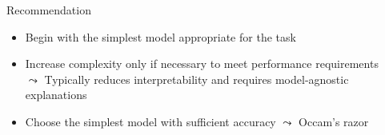 \documentclass[10pt,compress,t,notes=noshow, xcolor=table]{beamer}
\begin{document}
\begin{frame}{Recommendation}
\begin{itemize}
    \item Begin with the simplest model appropriate for the task
    \item Increase complexity only if necessary to meet performance requirements\\
    $\leadsto$ Typically reduces interpretability and requires model-agnostic explanations
    \item Choose the simplest model with sufficient accuracy 
    $\leadsto$ Occam’s razor
\end{itemize}
    \bigskip


\end{frame}
\end{document}
